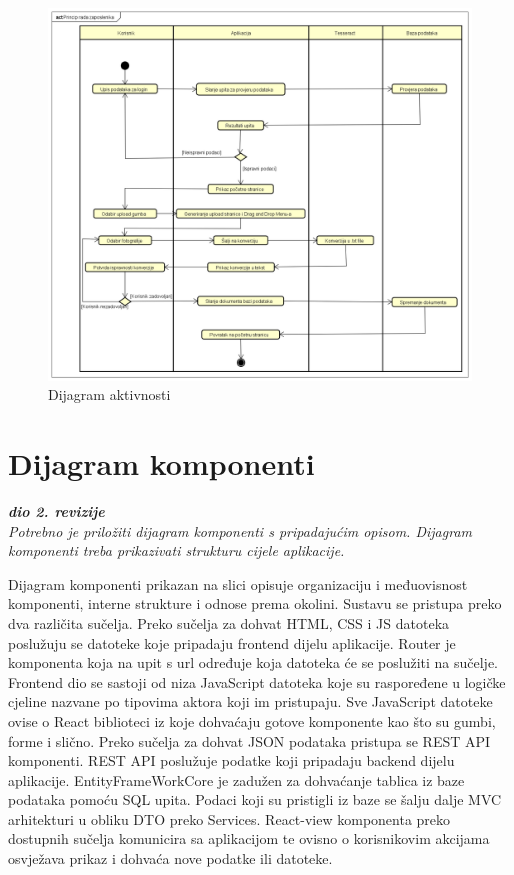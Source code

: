 			\begin{figure}[H]
				\includegraphics[scale=0.5]{slike/dijagram_aktivnosti.png} %
				\centering
				\caption{Dijagram aktivnosti}
				\label{fig:promjene}
			\end{figure}


			\eject
		\section{Dijagram komponenti}
		
			\textbf{\textit{dio 2. revizije}}\\
		
			 \textit{Potrebno je priložiti dijagram komponenti s pripadajućim opisom. Dijagram komponenti treba prikazivati strukturu cijele aplikacije.}

			 Dijagram komponenti prikazan na slici opisuje organizaciju i međuovisnost komponenti, interne strukture i odnose prema okolini. Sustavu se pristupa preko dva različita sučelja. Preko sučelja za dohvat HTML, CSS i JS datoteka poslužuju se datoteke koje pripadaju frontend dijelu aplikacije. Router je komponenta koja na upit s url određuje koja datoteka će se poslužiti na sučelje. Frontend dio se sastoji od niza JavaScript datoteka koje su raspoređene u logičke cjeline nazvane po tipovima aktora koji im pristupaju. Sve JavaScript datoteke ovise o React biblioteci iz koje dohvaćaju gotove komponente kao što su gumbi, forme i slično. Preko sučelja za dohvat JSON podataka pristupa se REST API komponenti. REST API poslužuje podatke koji pripadaju backend dijelu aplikacije. EntityFrameWorkCore je zadužen za dohvaćanje tablica iz baze podataka pomoću SQL upita. Podaci koji su pristigli iz baze se šalju dalje MVC arhitekturi u obliku DTO preko Services. React-view komponenta preko dostupnih sučelja komunicira sa aplikacijom te ovisno o korisnikovim akcijama osvježava prikaz i dohvaća nove podatke ili datoteke.

